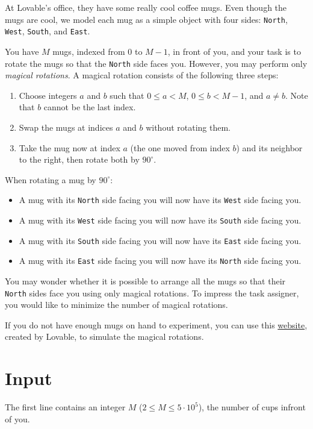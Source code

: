 

At Lovable's office, they have some really cool coffee mugs. 
Even though the mugs are cool, we model each mug as a simple object with four sides: \texttt{North}, \texttt{West}, \texttt{South}, and \texttt{East}.

You have $M$ mugs, indexed from $0$ to $M-1$, in front of you, 
and your task is to rotate the mugs so that the \texttt{North} side faces you. 
However, you may perform only \emph{magical rotations}. 
A magical rotation consists of the following three steps:
\begin{enumerate}
  \item Choose integers $a$ and $b$ such that $0 \le a < M$, $0 \le b < M-1$, and $a \neq b$. Note that $b$ cannot be the last index.
  \item Swap the mugs at indices $a$ and $b$ without rotating them.
  \item Take the mug now at index $a$ (the one moved from index $b$) and its neighbor to the right, then rotate both by $90^\circ$.
\end{enumerate}

When rotating a mug by $90^\circ$:
\begin{itemize}
  \item A mug with its \texttt{North} side facing you will now have its \texttt{West} side facing you.
  \item A mug with its \texttt{West} side facing you will now have its \texttt{South} side facing you.
  \item A mug with its \texttt{South} side facing you will now have its \texttt{East} side facing you.
  \item A mug with its \texttt{East} side facing you will now have its \texttt{North} side facing you.
\end{itemize}

You may wonder whether it is possible to arrange all the mugs so that their \texttt{North} sides face you using only magical rotations. To impress the task assigner, you would like to minimize the number of magical rotations.

If you do not have enough mugs on hand to experiment, you can use this \href{https://rotatingmugs.lovable.app/}{website}, created by Lovable, to simulate the magical rotations.
\section*{Input}
The first line contains an integer $M$ ($2 \leq M \leq 5 \cdot 10^5$), the number of cups infront of you.

